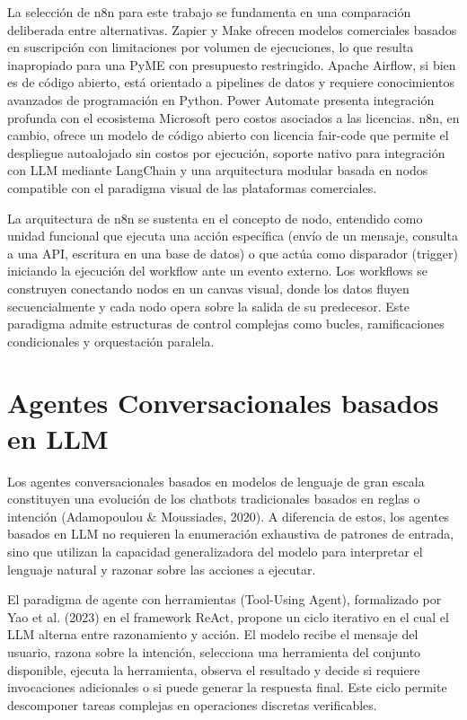 \documentclass[12pt,a4paper]{report}
\begin{document}
La selección de n8n para este trabajo se fundamenta en una comparación deliberada entre alternativas. Zapier y Make ofrecen modelos comerciales basados en suscripción con limitaciones por volumen de ejecuciones, lo que resulta inapropiado para una PyME con presupuesto restringido. Apache Airflow, si bien es de código abierto, está orientado a pipelines de datos y requiere conocimientos avanzados de programación en Python. Power Automate presenta integración profunda con el ecosistema Microsoft pero costos asociados a las licencias. n8n, en cambio, ofrece un modelo de código abierto con licencia fair-code que permite el despliegue autoalojado sin costos por ejecución, soporte nativo para integración con LLM mediante LangChain y una arquitectura modular basada en nodos compatible con el paradigma visual de las plataformas comerciales.

La arquitectura de n8n se sustenta en el concepto de nodo, entendido como unidad funcional que ejecuta una acción específica (envío de un mensaje, consulta a una API, escritura en una base de datos) o que actúa como disparador (trigger) iniciando la ejecución del workflow ante un evento externo. Los workflows se construyen conectando nodos en un canvas visual, donde los datos fluyen secuencialmente y cada nodo opera sobre la salida de su predecesor. Este paradigma admite estructuras de control complejas como bucles, ramificaciones condicionales y orquestación paralela.

\section{Agentes Conversacionales basados en LLM}

Los agentes conversacionales basados en modelos de lenguaje de gran escala constituyen una evolución de los chatbots tradicionales basados en reglas o intención (Adamopoulou \& Moussiades, 2020). A diferencia de estos, los agentes basados en LLM no requieren la enumeración exhaustiva de patrones de entrada, sino que utilizan la capacidad generalizadora del modelo para interpretar el lenguaje natural y razonar sobre las acciones a ejecutar.

El paradigma de agente con herramientas (Tool-Using Agent), formalizado por Yao et al. (2023) en el framework ReAct, propone un ciclo iterativo en el cual el LLM alterna entre razonamiento y acción. El modelo recibe el mensaje del usuario, razona sobre la intención, selecciona una herramienta del conjunto disponible, ejecuta la herramienta, observa el resultado y decide si requiere invocaciones adicionales o si puede generar la respuesta final. Este ciclo permite descomponer tareas complejas en operaciones discretas verificables.
\end{document}
